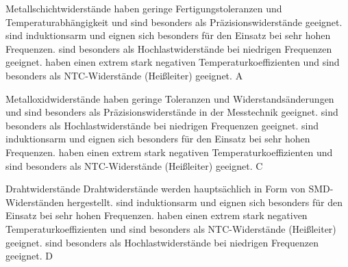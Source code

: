 
{Metallschichtwiderstände}
{haben geringe Fertigungstoleranzen und Temperaturabhängigkeit und sind besonders als Präzisionswiderstände geeignet.}
{sind induktionsarm und eignen sich besonders für den Einsatz bei sehr hohen Frequenzen.}
{sind besonders als Hochlastwiderstände bei niedrigen Frequenzen geeignet.}
{haben einen extrem stark negativen Temperaturkoeffizienten und sind besonders als NTC-Widerstände (Heißleiter) geeignet.}
{A}

{Metalloxidwiderstände}%
{haben geringe Toleranzen und Widerstandsänderungen und sind besonders als Präzisionswiderstände in der Messtechnik geeignet.}%
{sind besonders als Hochlastwiderstände bei niedrigen Frequenzen geeignet.}%
{sind induktionsarm und eignen sich besonders für den Einsatz bei sehr hohen Frequenzen.}%
{haben einen extrem stark negativen Temperaturkoeffizienten und sind besonders als NTC-Widerstände (Heißleiter) geeignet.}%
{C}%

{Drahtwiderstände}%
{Drahtwiderstände werden hauptsächlich in Form von SMD-Widerständen hergestellt.}%
{sind induktionsarm und eignen sich besonders für den Einsatz bei sehr hohen Frequenzen.}%
{haben einen extrem stark negativen Temperaturkoeffizienten und sind besonders als NTC-Widerstände (Heißleiter) geeignet.}%
{sind besonders als Hochlastwiderstände bei niedrigen Frequenzen geeignet.}%
{D}%

